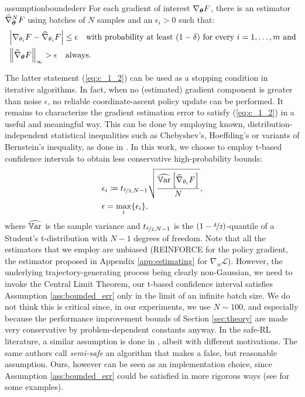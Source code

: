 \begin{restatable}[]{assumption}{boundederr}\label{ass:bounded_err}
	For each gradient of interest $\nabla_{\vtheta} F$, there is an estimator $\widehat{\nabla}_{\vtheta}^NF$ using batches of $N$ samples and an $\epsilon_i>0$ such that:
	\begin{align}
	&\left|\nabla_{\theta_i}F - \widehat{\nabla}_{\theta_i}F\right| \leq \epsilon 
		\quad\text{with probability at least $(1-\delta)$ for every $i=1,\dots,m$ and}\label{eq:c_1_1}\\
	&\norm[\infty]{\widehat{\nabla}_{\vtheta}F} > \epsilon\quad\text{always}.\label{eq:c_1_2}
	\end{align}
\end{restatable}
The latter statement (\ref{eq:c_1_2}) can be used as a stopping condition in iterative algorithms. In fact, when no (estimated) gradient component is greater than noise $\epsilon$, no reliable coordinate-ascent policy update can be performed. It remains to characterize the gradient estimation error to satisfy (\ref{eq:c_1_2}) in a useful and meaningful way. This can be done by employing known, distribution-independent statistical inequalities such as Chebyshev's, Hoeffding's or variants of Bernstein's inequality, as done in \cite{adaptive_batch}. In this work, we choose to employ t-based confidence intervals to obtain less conservative high-probability bounds:
\begin{align*}
	&\epsilon_i \coloneqq t_{\nicefrac{\delta}{2}, N-1}\sqrt{\frac{\widehat{\Var}\left[\widehat{\nabla}_{\theta_i}F\right]}
		{N}},\\
	&\epsilon = \max_i\{\epsilon_i\},
\end{align*}
where $\widehat{\Var}$ is the sample variance and $t_{\nicefrac{\delta}{2},N-1}$ is the $(1-\nicefrac{\delta}{2})$-quantile of a Student's t-distribution with $N-1$ degrees of freedom. Note that all the estimators that we employ are unbiased (REINFORCE for the policy gradient, the estimator proposed in Appendix \ref{app:estimating} for $\nabla_w\mathcal{L}$). However, the underlying trajectory-generating process being clearly non-Gaussian, we need to invoke the Central Limit Theorem, \ie our t-based confidence interval satisfies Assumption \ref{ass:bounded_err} only in the limit of an infinite batch size. We do not think this is critical since, in our experiments, we use $N\sim 100$, and especially because the performance improvement bounds of Section \ref{sec:theory} are made very conservative by problem-dependent constants anyway. In the safe-RL literature, a similar  assumption is done in \cite{pmlr-v37-thomas15}, albeit with different motivations. The same authors call \textit{semi-safe} an algorithm that makes a false, but reasonable assumption. Ours, however can be seen as an implementation choice, since Assumption \ref{ass:bounded_err} could be satisfied in more rigorous ways (see \cite{adaptive_batch} for some examples).

